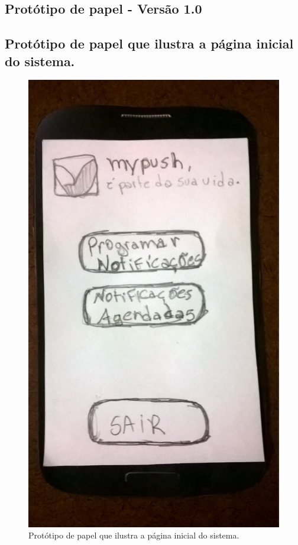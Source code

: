\begin{apendicesenv}
\chapter{Protótipo de papel - Versão 1.0}

  \section*{Protótipo de papel que ilustra a página inicial do sistema.}
  
    \begin{figure}[!htbp]
      \centering
      \includegraphics[scale=0.3]{editaveis/figuras/prototipo_papel_v1/pagina_inicial}
      \caption{Protótipo de papel que ilustra a página inicial do sistema.}
      \label{pagina_inicial_v1}
    \end{figure}
  

\end{apendicesenv}
